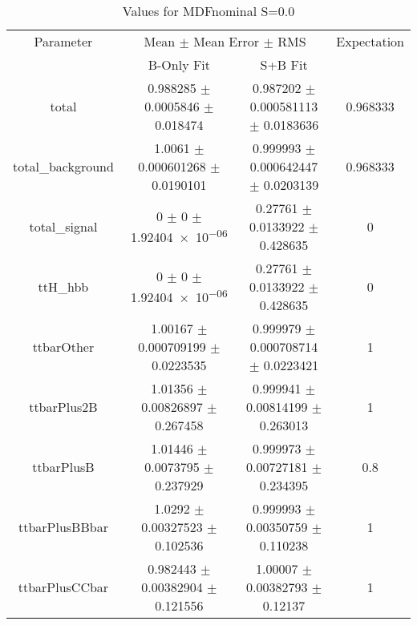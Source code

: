 \begin{table}
\centering
\caption{Values for MDFnominal S=0.0}
\begin{tabular}{cccc}
\toprule
Parameter & \multicolumn{2}{c}{Mean $\pm$ Mean Error $\pm$ RMS} & Expectation\\
 & B-Only Fit & S+B Fit & \\
\midrule
total & \num{0.988285} $\pm$ \num{0.0005846} $\pm$ \num{0.018474} & \num{0.987202} $\pm$ \num{0.000581113} $\pm$ \num{0.0183636} & \num{0.968333}\\
total\_background & \num{1.0061} $\pm$ \num{0.000601268} $\pm$ \num{0.0190101} & \num{0.999993} $\pm$ \num{0.000642447} $\pm$ \num{0.0203139} & \num{0.968333}\\
total\_signal & \num{0} $\pm$ \num{0} $\pm$ \num{1.92404e-06} & \num{0.27761} $\pm$ \num{0.0133922} $\pm$ \num{0.428635} & \num{0}\\
ttH\_hbb & \num{0} $\pm$ \num{0} $\pm$ \num{1.92404e-06} & \num{0.27761} $\pm$ \num{0.0133922} $\pm$ \num{0.428635} & \num{0}\\
ttbarOther & \num{1.00167} $\pm$ \num{0.000709199} $\pm$ \num{0.0223535} & \num{0.999979} $\pm$ \num{0.000708714} $\pm$ \num{0.0223421} & \num{1}\\
ttbarPlus2B & \num{1.01356} $\pm$ \num{0.00826897} $\pm$ \num{0.267458} & \num{0.999941} $\pm$ \num{0.00814199} $\pm$ \num{0.263013} & \num{1}\\
ttbarPlusB & \num{1.01446} $\pm$ \num{0.0073795} $\pm$ \num{0.237929} & \num{0.999973} $\pm$ \num{0.00727181} $\pm$ \num{0.234395} & \num{0.8}\\
ttbarPlusBBbar & \num{1.0292} $\pm$ \num{0.00327523} $\pm$ \num{0.102536} & \num{0.999993} $\pm$ \num{0.00350759} $\pm$ \num{0.110238} & \num{1}\\
ttbarPlusCCbar & \num{0.982443} $\pm$ \num{0.00382904} $\pm$ \num{0.121556} & \num{1.00007} $\pm$ \num{0.00382793} $\pm$ \num{0.12137} & \num{1}\\
\bottomrule
\end{tabular}
\end{table}